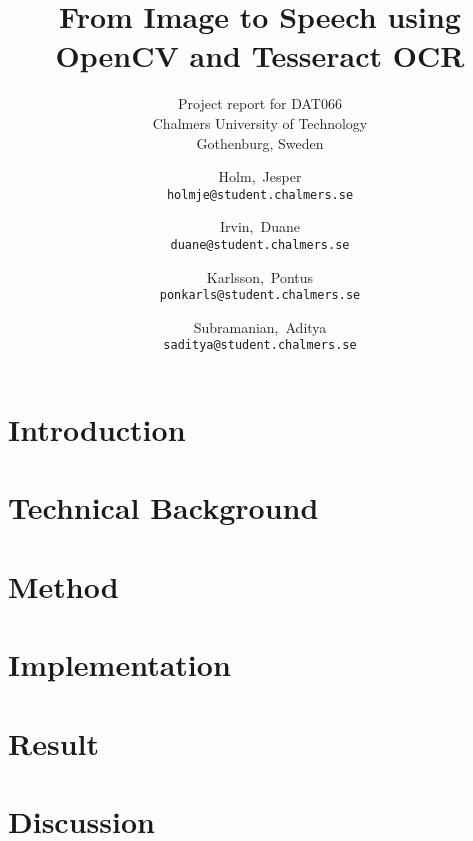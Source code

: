 \documentclass[a4paper, english, abstract=on]{scrartcl}
\begin{document}

\title{From Image to Speech using \\ OpenCV and Tesseract OCR}
\subtitle{Project report for DAT066 \\
  Chalmers University of Technology \\
  Gothenburg, Sweden
}
\author{
  Holm,~Jesper \\ \texttt{holmje@student.chalmers.se}
  \and Irvin,~Duane \\ \texttt{duane@student.chalmers.se}
  \and Karlsson,~Pontus \\ \texttt{ponkarls@student.chalmers.se}
  \and Subramanian,~Aditya \\ \texttt{saditya@student.chalmers.se}
}
\clearpage\maketitle
\thispagestyle{empty}
\pagebreak


\thispagestyle{empty}
\pagebreak

\hypersetup{linkcolor=black}
\tableofcontents
\thispagestyle{empty}
\pagebreak

\setcounter{page}{1}

\section{Introduction}


\section{Technical Background}


\section{Method}


\section{Implementation}


\section{Result}


\section{Discussion}


\pagebreak


\end{document}
